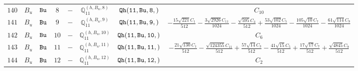 \documentclass[fleqn,8pt]{jsarticle}
\begin{document}
\begin{table}[ht!]
\begin{center}
\begin{tabular}{cccccccc}
$ 140 $ & $ B_{u} $ & $ {\tt Bu} $ & $ 8 $ & $ - $ & $ \mathbb{Q}_{11}^{(h,B_{u},8)} $ & $ {\tt Qh(11,Bu,8,)} $ & $ C_{10} $ \\
$ 141 $ & $ B_{u} $ & $ {\tt Bu} $ & $ 9 $ & $ - $ & $ \mathbb{Q}_{11}^{(h,B_{u},9)} $ & $ {\tt Qh(11,Bu,9,)} $ & $ - \frac{15 \sqrt{221} C_{1}}{512} - \frac{3 \sqrt{2926} C_{11}}{1024} - \frac{\sqrt{595} C_{3}}{512} + \frac{53 \sqrt{102} C_{5}}{1024} - \frac{105 \sqrt{10} C_{7}}{1024} - \frac{61 \sqrt{114} C_{9}}{1024} $ \\
$ 142 $ & $ B_{u} $ & $ {\tt Bu} $ & $ 10 $ & $ - $ & $ \mathbb{Q}_{11}^{(h,B_{u},10)} $ & $ {\tt Qh(11,Bu,10,)} $ & $ C_{6} $ \\
$ 143 $ & $ B_{u} $ & $ {\tt Bu} $ & $ 11 $ & $ - $ & $ \mathbb{Q}_{11}^{(h,B_{u},11)} $ & $ {\tt Qh(11,Bu,11,)} $ & $ - \frac{21 \sqrt{130} C_{1}}{512} - \frac{\sqrt{124355} C_{11}}{512} + \frac{57 \sqrt{14} C_{3}}{512} - \frac{41 \sqrt{15} C_{5}}{512} + \frac{17 \sqrt{17} C_{7}}{512} + \frac{\sqrt{4845} C_{9}}{512} $ \\
$ 144 $ & $ B_{u} $ & $ {\tt Bu} $ & $ 12 $ & $ - $ & $ \mathbb{Q}_{11}^{(h,B_{u},12)} $ & $ {\tt Qh(11,Bu,12,)} $ & $ C_{2} $ \\
 \hline \hline
\end{tabular}
\end{center}
\end{table}
\end{document}
